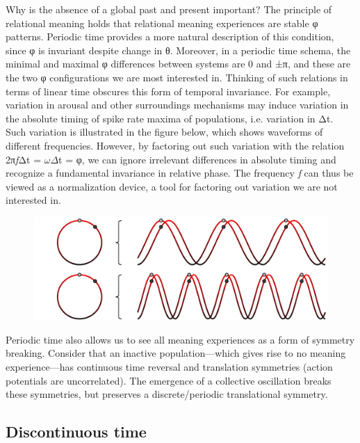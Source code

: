   Why is the absence of a global past and present important? The principle of relational meaning holds that relational meaning experiences are stable φ patterns. Periodic time provides a more natural description of this condition, since φ is invariant despite change in θ. Moreover, in a periodic time schema, the minimal and maximal φ differences between systems are 0 and ±π, and these are the two φ configurations we are most interested in. Thinking of such relations in terms of linear time obscures this form of temporal invariance. For example, variation in arousal and other surroundings mechanisms may induce variation in the absolute timing of spike rate maxima of populations, i.e. variation in Δt. Such variation is illustrated in the figure below, which shows waveforms of different frequencies. However, by factoring out such variation with the relation 2π\textit{f}Δt = $\omega \Delta $t = φ, we can ignore irrelevant differences in absolute timing and recognize a fundamental invariance in relative phase. The frequency \textit{f} can thus be viewed as a normalization device, a tool for factoring out variation we are not interested in.

  
\begin{figure}
\includegraphics[width=\textwidth]{figures/Tilsen-img48.png}
\caption{\missingcaption}
\label{fig:}
\end{figure}
 

  Periodic time also allows us to see all meaning experiences as a form of symmetry breaking. Consider that an inactive population—which gives rise to no meaning experience—has continuous time reversal and translation symmetries (action potentials are uncorrelated). The emergence of a collective oscillation breaks these symmetries, but preserves a discrete/periodic translational symmetry.

\subsection{Discontinuous time}

